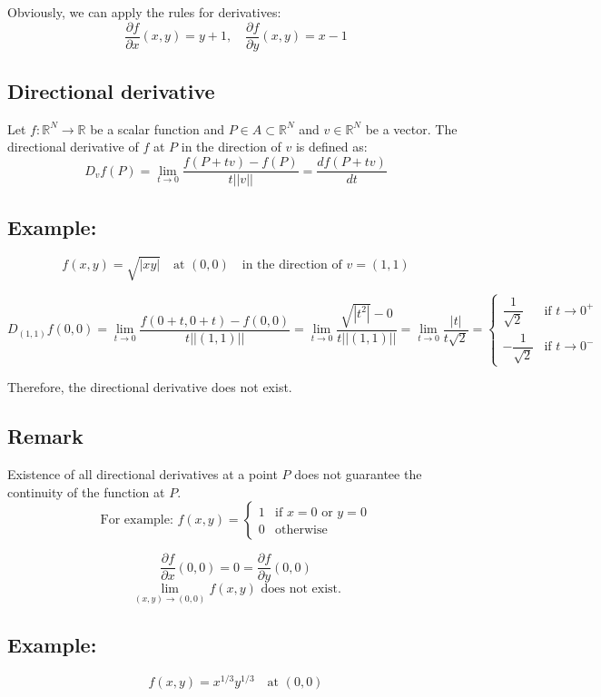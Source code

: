\documentclass[11pt]{article}
\begin{document}
Obviously, we can apply the rules for derivatives:
\[
\frac{\partial f}{\partial x}(x,y) = y + 1, \quad \frac{\partial f}{\partial y}(x,y) = x - 1
\]

\subsection{Directional derivative}
Let $f : \mathbb{R}^N \rightarrow \mathbb{R}$ be a scalar function and $P \in A \subset \mathbb{R}^N$ and $v \in \mathbb{R}^N$ be a vector. The directional derivative of $f$ at $P$ in the direction of $v$ is defined as:
\[
D_v f(P) = \lim_{t \to 0} \frac{f(P + t v) - f(P)}{t||v||} = \frac{df(P + tv)}{dt} 
\]

\subsection*{Example:}
\[
f(x,y) = \sqrt{|xy|} \quad \text{at } (0,0) \quad \text{in the direction of } v = (1,1)
\]

\[
D_{(1,1)} f(0,0) = \lim_{t \to 0} \frac{f(0 + t, 0 + t) - f(0,0)}{t||(1,1)||} = \lim_{t \to 0} \frac{\sqrt{|t^2|} - 0}{t||(1,1)||} = \lim_{t \to 0} \frac{|t|}{t\sqrt{2}} = 
\begin{cases}
    \dfrac{1}{\sqrt{2}} & \text{if } t \to 0^+ \\
    -\dfrac{1}{\sqrt{2}} & \text{if } t \to 0^-
\end{cases}
\]

Therefore, the directional derivative does not exist.

\subsection{Remark}
Existence of all directional derivatives at a point $P$ does not guarantee the continuity of the function at $P$.
\[
\text{For example: } f(x,y) =
\begin{cases}
    1 & \text{if } x = 0 \text{ or } y = 0 \\
    0 & \text{otherwise}
\end{cases}
\]

\[
\frac{\partial f}{\partial x}(0,0) = 0 = \frac{\partial f}{\partial y}(0,0)
\]
\[
\lim_{(x,y) \to (0,0)} f(x,y) \text{ does not exist.}
\]

\subsection*{Example:}
\[
f(x,y) = x^{1/3}y^{1/3} \quad \text{at } (0,0)
\]
\end{document}
